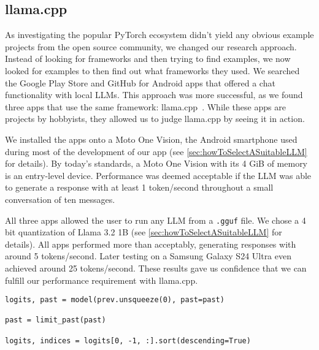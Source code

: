 \subsection{llama.cpp}
\label{sec:llamaCpp}
As investigating the popular PyTorch ecosystem didn't yield any obvious example projects from the open source community, we changed our research approach. Instead of looking for frameworks and then trying to find examples, we now looked for examples to then find out what frameworks they used. We searched the Google Play Store and GitHub for Android apps that offered a chat functionality with local \glspl{LLM}. This approach was more successful, as we found three apps that use the same framework: llama.cpp~\cite{panchalShubham0204SmolChatAndroid2025,vali-98Vali98ChatterUI2025,ghorbaniAghorbaniPocketpalai2025}. While these apps are projects by hobbyists, they allowed us to judge llama.cpp by seeing it in action.

We installed the apps onto a Moto One Vision, the Android smartphone used during most of the development of our app (see \cref{sec:howToSelectASuitableLLM} for details). By today's standards, a Moto One Vision with its 4 GiB of memory is an entry-level device. Performance was deemed acceptable if the \gls{LLM} was able to generate a response with at least 1 token/second throughout a small conversation of ten messages.

All three apps allowed the user to run any \gls{LLM} from a \lstinline|.gguf| file. We chose a 4 bit quantization of Llama 3.2 1B (see \cref{sec:howToSelectASuitableLLM} for details). All apps performed more than acceptably, generating responses with around 5 tokens/second. Later testing on a Samsung Galaxy S24 Ultra even achieved around 25 tokens/second. These results gave us confidence that we can fulfill our performance requirement with llama.cpp.

\vspace{0.25cm}

\begin{lstlisting}[caption={[PyTorch]{Snippet of the Stegasuras code needed to get logits from a \gls{LLM} using PyTorch~\cite{zieglerHarvardnlpNeuralSteganography2025}. Tensor operations are exposed whenever indices of an object are queried.}}, label={lst:pyTorch}]
logits, past = model(prev.unsqueeze(0), past=past)

past = limit_past(past)

logits, indices = logits[0, -1, :].sort(descending=True)
\end{lstlisting}


